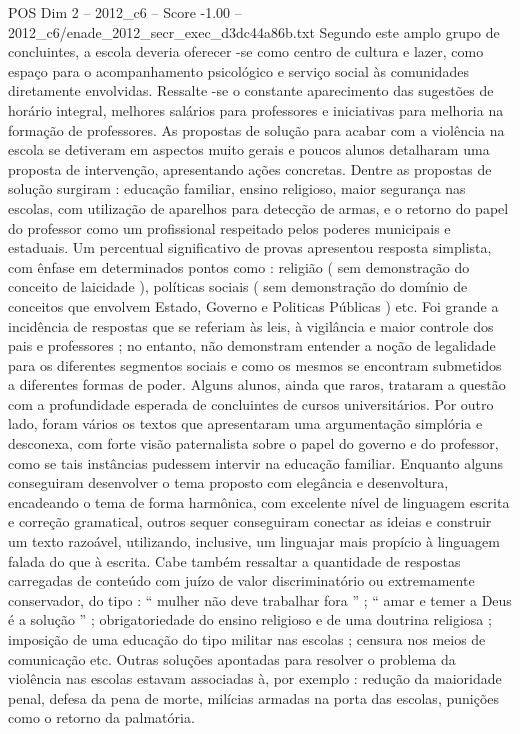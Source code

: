 \begin{textsample}{POS Dim 2 – 2012\_c6 – Score -1.00 – 2012\_c6/enade\_2012\_secr\_exec\_d3dc44a86b.txt}
Segundo este amplo grupo de concluintes, a escola deveria oferecer -se como centro de cultura e lazer, como espaço para o acompanhamento psicológico e serviço social às comunidades diretamente envolvidas.
Ressalte -se o constante aparecimento das sugestões de horário integral, melhores salários para professores e iniciativas para melhoria na formação de professores.
As propostas de solução para acabar com a violência na escola se detiveram em aspectos muito gerais e poucos alunos detalharam uma proposta de intervenção, apresentando ações concretas.
Dentre as propostas de solução surgiram : educação familiar, ensino religioso, maior segurança nas escolas, com utilização de aparelhos para detecção de armas, e o retorno do papel do professor como um profissional respeitado pelos poderes municipais e estaduais.
Um percentual significativo de provas apresentou resposta simplista, com ênfase em determinados pontos como : religião ( sem demonstração do conceito de laicidade ), políticas sociais ( sem demonstração do domínio de conceitos que envolvem Estado, Governo e Politicas Públicas ) etc.
Foi grande a incidência de respostas que se referiam às leis, à vigilância e maior controle dos pais e professores ; no entanto, não demonstram entender a noção de legalidade para os diferentes segmentos sociais e como os mesmos se encontram submetidos a diferentes formas de poder.
Alguns alunos, ainda que raros, trataram a questão com a profundidade esperada de concluintes de cursos universitários.
Por outro lado, foram vários os textos que apresentaram uma argumentação simplória e desconexa, com forte visão paternalista sobre o papel do governo e do professor, como se tais instâncias pudessem intervir na educação familiar.
Enquanto alguns conseguiram desenvolver o tema proposto com elegância e desenvoltura, encadeando o tema de forma harmônica, com excelente nível de linguagem escrita e correção gramatical, outros sequer conseguiram conectar as ideias e construir um texto razoável, utilizando, inclusive, um linguajar mais propício à linguagem falada do que à escrita.
Cabe também ressaltar a quantidade de respostas carregadas de conteúdo com juízo de valor discriminatório ou extremamente conservador, do tipo : “ mulher não deve trabalhar fora ” ; “ amar e temer a Deus é a solução ” ; obrigatoriedade do ensino religioso e de uma doutrina religiosa ; imposição de uma educação do tipo militar nas escolas ; censura nos meios de comunicação etc.
Outras soluções apontadas para resolver o problema da violência nas escolas estavam associadas à, por exemplo : redução da maioridade penal, defesa da pena de morte, milícias armadas na porta das escolas, punições como o retorno da palmatória.

\end{textsample}
